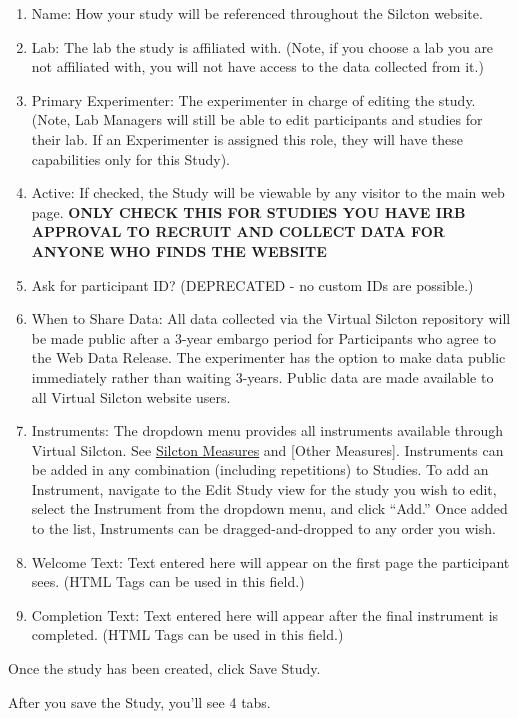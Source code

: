 \documentclass[
  12pt,
]{book}
\providecommand{\tightlist}{%
  \setlength{\itemsep}{0pt}\setlength{\parskip}{0pt}}
\begin{document}
\begin{enumerate}
\def\labelenumi{\arabic{enumi}.}
\tightlist
\item
  Name: How your study will be referenced throughout the Silcton website.
\item
  Lab: The lab the study is affiliated with. (Note, if you choose a lab you are not affiliated with, you will not have access to the data collected from it.)
\item
  Primary Experimenter: The experimenter in charge of editing the study. (Note, Lab Managers will still be able to edit participants and studies for their lab. If an Experimenter is assigned this role, they will have these capabilities only for this Study).
\item
  Active: If checked, the Study will be viewable by any visitor to the main web page. \textbf{ONLY CHECK THIS FOR STUDIES YOU HAVE IRB APPROVAL TO RECRUIT AND COLLECT DATA FOR ANYONE WHO FINDS THE WEBSITE}
\item
  Ask for participant ID? (DEPRECATED - no custom IDs are possible.)
\item
  When to Share Data: All data collected via the Virtual Silcton repository will be made public after a 3-year embargo period for Participants who agree to the Web Data Release. The experimenter has the option to make data public immediately rather than waiting 3-years. Public data are made available to all Virtual Silcton website users.
\item
  Instruments: The dropdown menu provides all instruments available through Virtual Silcton. See \protect\hyperlink{silcton-measures}{Silcton Measures} and {[}Other Measures{]}. Instruments can be added in any combination (including repetitions) to Studies. To add an Instrument, navigate to the Edit Study view for the study you wish to edit, select the Instrument from the dropdown menu, and click ``Add.'' Once added to the list, Instruments can be dragged-and-dropped to any order you wish.
\item
  Welcome Text: Text entered here will appear on the first page the participant sees. (HTML Tags can be used in this field.)
\item
  Completion Text: Text entered here will appear after the final instrument is completed. (HTML Tags can be used in this field.)
\end{enumerate}

Once the study has been created, click Save Study.

After you save the Study, you'll see 4 tabs.
\end{document}
